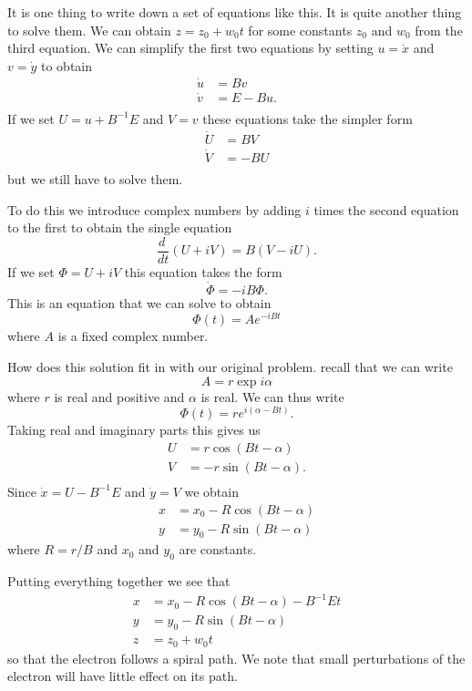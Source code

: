 \documentclass[12pt]{article}
\theoremstyle{definition}
\begin{document}
It is one thing to write down a set of equations like this.
It is quite another thing to solve them. We can obtain
$z=z_{0}+w_{0}t$ for some constants $z_{0}$ and $w_{0}$
from the third equation. We can simplify the first
two equations by setting $u=\dot{x}$ and $v=\dot{y}$
to obtain
\begin{align*}
\dot{u}&=Bv\\
\dot{v}&=E-Bu.\\
\end{align*}
If we set $U=u+B^{-1}E$ and $V=v$ these equations
take the simpler form
\begin{align*}
\dot{U}&=BV\\
\dot{V}&=-BU\\
\end{align*}
but we still have to solve them.

To do this we introduce complex numbers by
adding $i$ times the second equation to the first
to obtain the single equation
\[\frac{d\ }{dt}(U+iV)=B(V-iU).\]
If we set $\Phi=U+iV$ this equation takes the form
\[\dot{\Phi}=-iB\Phi.\]
This is an equation that we can solve to obtain
\[\Phi(t)=Ae^{-iBt}\]
where $A$ is a fixed complex number.

How does this solution fit in with our original problem.
recall that we can write
\[A=r\exp i\alpha\]
where $r$ is real and positive and $\alpha$ is real.
We can thus write
\[\Phi(t)=re^{i(\alpha-Bt)}.\]
Taking real and imaginary parts this gives us
\begin{align*}
U&=r\cos(Bt-\alpha)\\
V&=-r\sin(Bt-\alpha).\\
\end{align*}
Since $\dot{x}=U-B^{-1}E$ and $\dot{y}=V$
we obtain
\begin{align*}
x&=x_{0}-R\cos(Bt-\alpha)\\
y&=y_{0}-R\sin(Bt-\alpha)
\end{align*}
where $R=r/B$ and $x_{0}$ and $y_{0}$ are constants.

Putting everything together we see that
\begin{align*}
x&=x_{0}-R\cos(Bt-\alpha)-B^{-1}Et\\
y&=y_{0}-R\sin(Bt-\alpha)\\
z&=z_{0}+w_{0}t
\end{align*}
so that the electron follows a spiral path.
We note that small perturbations of the electron will have little
effect on its path.
\end{document}
